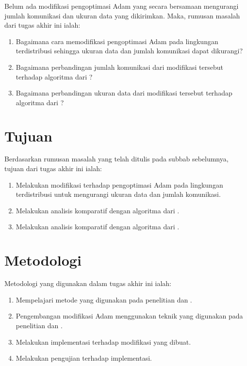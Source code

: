 Belum ada modifikasi pengoptimasi Adam yang secara bersamaan mengurangi jumlah komunikasi dan ukuran data yang dikirimkan. Maka, rumusan masalah dari tugas akhir ini ialah:

\begin{enumerate}
    \item Bagaimana cara memodifikasi pengoptimasi Adam pada lingkungan terdistribusi sehingga ukuran data dan jumlah komunikasi dapat dikurangi?
    \item Bagaimana perbandingan jumlah komunikasi dari modifikasi tersebut terhadap algoritma dari \textcite{Chen2021CADA}?
    \item Bagaimana perbandingan ukuran data dari modifikasi tersebut terhadap algoritma dari \textcite{Chen2022Efficient}?
\end{enumerate}

\section{Tujuan}

Berdasarkan rumusan masalah yang telah ditulis pada subbab sebelumnya, tujuan dari tugas akhir ini ialah:
\begin{enumerate}
    \item Melakukan modifikasi terhadap pengoptimasi Adam pada lingkungan terdistribusi untuk mengurangi ukuran data dan jumlah komunikasi.
    \item Melakukan analisis komparatif dengan algoritma dari \textcite{Chen2021CADA}.
    \item Melakukan analisis komparatif dengan algoritma dari \textcite{Chen2022Efficient}.
\end{enumerate}

\section{Metodologi}

Metodologi yang digunakan dalam tugas akhir ini ialah:
\begin{enumerate}
    \item Mempelajari metode yang digunakan pada penelitian \textcite{Chen2021CADA} dan \textcite{Chen2022Efficient}.
    \item Pengembangan modifikasi Adam menggunakan teknik yang digunakan pada penelitian \textcite{Chen2021CADA} dan \textcite{Chen2022Efficient}.
    \item Melakukan implementasi terhadap modifikasi yang dibuat.
    \item Melakukan pengujian terhadap implementasi.
\end{enumerate}

